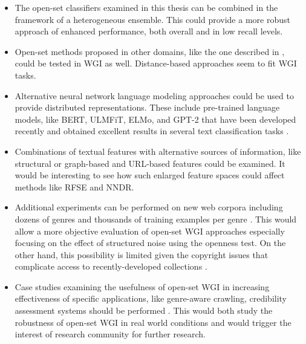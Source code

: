 \begin{itemize}
    \item The open-set classifiers examined in this thesis can be combined in the framework of a heterogeneous ensemble. This could provide a more robust approach of enhanced performance, both overall and in low recall levels.
    \item Open-set methods proposed in other domains, like the one described in , could be tested in WGI as well. Distance-based approaches seem to fit WGI tasks. 
    \item Alternative neural network language modeling approaches could be used to provide distributed representations. These include pre-trained language models, like BERT, ULMFiT, ELMo, and GPT-2 that have been developed recently and obtained excellent results in several text classification tasks .
    \item Combinations of textual features with alternative sources of information, like structural or graph-based and URL-based features could be examined. It would be interesting to see how such enlarged feature spaces could affect methods like RFSE and NNDR.
    \item Additional experiments can be performed on new web corpora including dozens of genres and thousands of training examples per genre . This would allow a more objective evaluation of open-set WGI approaches especially focusing on the effect of structured noise using the openness test. On the other hand, this possibility is limited given the copyright issues that complicate access to recently-developed collections .
    \item Case studies examining the usefulness of open-set WGI in increasing effectiveness of specific applications, like genre-aware crawling, credibility assessment systems should be performed . This would both study the robustness of open-set WGI in real world conditions and would trigger the interest of research community for further research.
    
\end{itemize}

